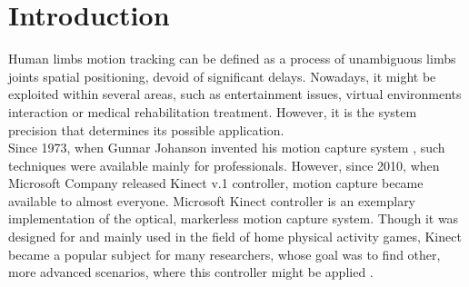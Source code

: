\documentclass[sensors,article,submit,moreauthors,pdftex,10pt,a4paper]{mdpi}
\begin{document}


\section{Introduction}

Human limbs motion tracking can be defined as a process of unambiguous limbs joints spatial positioning, devoid of significant delays. Nowadays, it might be exploited within several areas, such as entertainment issues, virtual environments interaction or medical rehabilitation treatment. However, it is the system precision that determines its possible application. \\
Since 1973, when Gunnar Johanson invented his motion capture system \cite{Johansson1973}, such techniques were available mainly for professionals. However, since 2010, when Microsoft Company released Kinect v.1 controller, motion capture became available to almost everyone. Microsoft Kinect controller is an exemplary implementation of the optical, markerless motion capture system. Though it was designed for and mainly used in the field of home physical activity games, Kinect became a popular subject for many researchers, whose goal was to find other, more advanced scenarios, where this controller might be applied \cite{Lange2012, Chang2011}.
\end{document}
